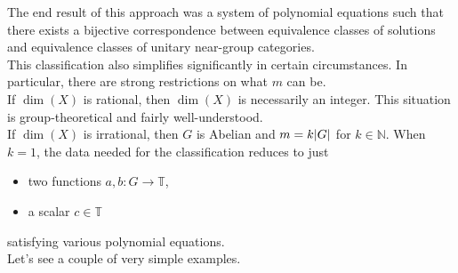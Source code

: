 \documentclass{beamer}
\DeclarePairedDelimiter{\abs}{\lvert}{\rvert}
\begin{document}
\begin{frame}
The end result of this approach was a system of polynomial equations such that there exists a \textcolor{structure}{bijective correspondence} between equivalence classes of solutions and equivalence classes of unitary near-group categories.\\[2ex]

This classification also simplifies significantly in certain circumstances. In particular, there are strong restrictions on what $m$ can be.\\[2ex]

If \textcolor{structure}{$\dim(X)$ is rational}, then $\dim(X)$ is necessarily an integer. This situation is group-theoretical and fairly well-understood.\\[2ex]

If \textcolor{structure}{$\dim(X)$ is irrational}, then $G$ is Abelian and $m = k\abs{G}$ for $k \in \mathbb{N}$. When $k = 1$, the data needed for the classification reduces to just\\[0.5ex]
\begin{itemize}
\item two functions $a, b : G \to \mathbb{T}$,\\[1ex]
\item a scalar $c \in \mathbb{T}$\\[1ex]
\end{itemize}
satisfying various polynomial equations.\\[2ex]

Let's see a couple of very simple examples.
\end{frame}
\end{document}
